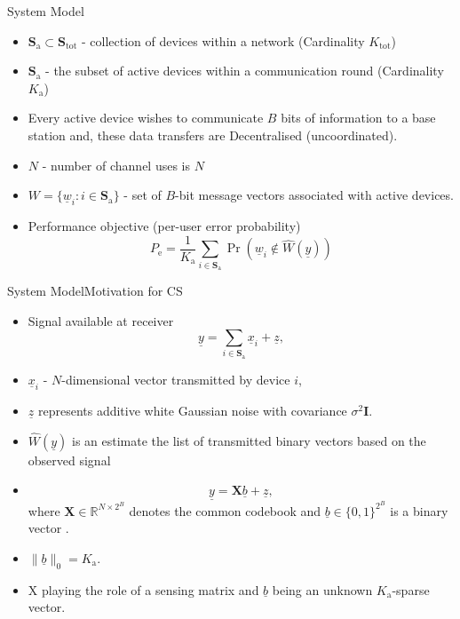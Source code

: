 \documentclass[aspectratio=169, handout, 10pt, hyperref=colorlinks]{beamer}
\begin{document}
\begin{frame}{System Model}
\begin{itemize}
    \item  $\mathbf{S}_{\mathrm{a}}$$\subset\mathbf{S}_{\mathrm{tot}}$ - collection of devices within a network (Cardinality $K_{\mathrm{tot}}$)
    \item $\mathbf{S}_{\mathrm{a}}$ - the subset of active devices within a communication round (Cardinality $K_{\mathrm{a}}$)
    \item Every active device wishes to communicate $B$ bits of information to a base station and,   these data transfers are Decentralised (uncoordinated).
    \item $N$ - number of channel uses is $N$
    \item $W=\{\underline{w}_i:i\in\mathbf{S}_{\mathrm{a}}\}$ - set of $B$-bit message vectors associated with active devices.
    \item Performance objective (per-user error probability)
\begin{equation*}
    P_{\mathrm{e}}=\frac{1}{K_{\mathrm{a}}}\sum_{i\in\mathbf{S}_{\mathrm{a}}}\Pr\left(\underline{w}_{i}\notin\widehat{W}(\underline{y})\right)
\end{equation*}
\end{itemize}
\end{frame}

\begin{frame}{System Model}{Motivation for CS}
\begin{itemize}
    \item Signal available at receiver
    \begin{equation*}
    \underline{y}=\sum_{i\in\mathbf{S}_{\mathrm{a}}}\underline{x}_i+\underline{z},
    \end{equation*}
    \item   $\underline{x}_i$ - $N$-dimensional vector transmitted by device $i$,
    \item $\underline{z}$ represents additive white Gaussian noise with covariance $\sigma^2\mathbf{I}.$ 
    \item $\widehat{W}(\underline{y})$ is an estimate the list of
transmitted binary vectors based on the observed
signal
\item $$\underline y=\mathbf{X}\underline{b}+\underline{z},$$
where $\mathbf{X}\in\mathbb{R}^{N\times2^B}$ denotes the common codebook and $\underline{b}\in\{0,1\}^{2^B}$ is a binary vector .  
\item $\|\underline{b}\|_0=K_{\mathrm{a}}.$ 
\item   X playing the role of a sensing matrix and $\underline{b}$ being an unknown $K_\mathrm{a}$-sparse vector. 

\end{itemize}
\end{frame}
\end{document}

